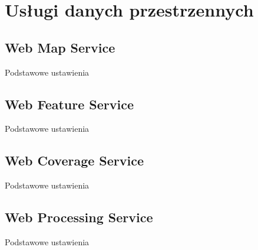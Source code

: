 \chapter{Usługi danych przestrzennych}
	\section{Web Map Service}
	Podstawowe ustawienia
	\section{Web Feature Service}
	Podstawowe ustawienia	
	\section{Web Coverage Service}
	Podstawowe ustawienia	 
	\section{Web Processing Service}
	Podstawowe ustawienia	

